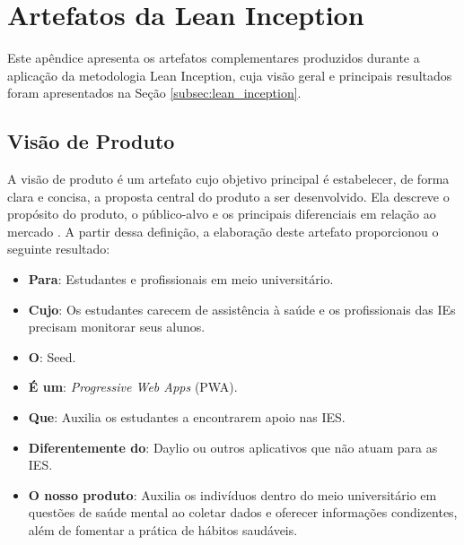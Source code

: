 \chapter{Artefatos da Lean Inception}
\label{apendice:lean_inception}

Este apêndice apresenta os artefatos complementares produzidos durante a  aplicação da metodologia Lean Inception, cuja visão geral e principais resultados foram apresentados na Seção \ref{subsec:lean_inception}.


%
%

\section{Visão de Produto}

A visão de produto é um artefato cujo objetivo principal é estabelecer, de forma clara e concisa, a proposta central do produto a ser desenvolvido. Ela descreve o propósito do produto, o público-alvo e os principais diferenciais em relação ao mercado \cite{caroli2017lean}. A partir dessa definição, a elaboração deste artefato proporcionou o seguinte resultado:

\begin{itemize}

    \item \textbf{Para}: Estudantes e profissionais em meio universitário.

    \item \textbf{Cujo}: Os estudantes carecem de assistência à saúde e os profissionais das IEs precisam monitorar seus alunos.

    \item \textbf{O}: Seed.

    \item \textbf{É um}: \textit{Progressive Web Apps} (PWA).

    \item \textbf{Que}: Auxilia os estudantes a encontrarem apoio nas IES.

    \item \textbf{Diferentemente do}: Daylio ou outros aplicativos que não atuam para as IES.

    \item \textbf{O nosso produto}: Auxilia os indivíduos dentro do meio universitário em questões de saúde mental ao coletar dados e oferecer informações condizentes, além de fomentar a prática de hábitos saudáveis.

\end{itemize}

